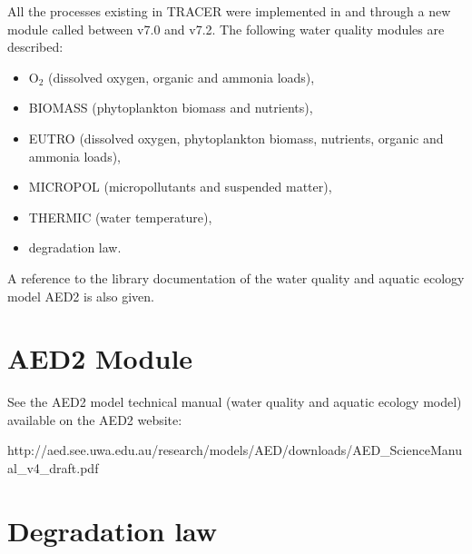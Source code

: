 \documentclass[Waqtel]{../../data/TelemacDoc} %
\begin{document}
All the processes existing in TRACER were implemented in  and  through
a new module called \waqtel between v7.0 and v7.2.
The following water quality modules are described:
\begin{itemize}
\item O$_2$ (dissolved oxygen, organic and ammonia loads),
\item BIOMASS (phytoplankton biomass and nutrients),
\item EUTRO (dissolved oxygen, phytoplankton biomass, nutrients, organic and ammonia loads),
\item MICROPOL (micropollutants and suspended matter),
\item THERMIC (water temperature),
\item degradation law.
\end{itemize}
A reference to the library documentation of the water quality and aquatic ecology model
AED2 is also given.

\newpage














\chapter{AED2 Module}

See the AED2 model technical manual (water quality and aquatic ecology model)
available on the AED2 website:

http://aed.see.uwa.edu.au/research/models/AED/downloads/AED\_ScienceManual\_v4\_draft.pdf


\chapter{Degradation law}


\end{document}
